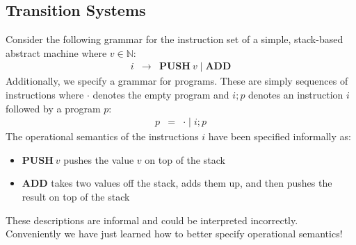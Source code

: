 \documentclass[10pt,a4paper]{exam}
\begin{document}
\begin{questions}

\section*{Transition Systems}

\question Consider the following grammar for the instruction set of a simple, stack-based abstract machine where $v \in \mathbb{N}$:
\begin{displaymath}
\begin{array}{lcl}
i & \to & \mathbf{PUSH}~v \mid \mathbf{ADD}
\end{array}
\end{displaymath}
Additionally, we specify a grammar for programs. These are simply sequences of instructions where $\cdot$ denotes the empty program and $i;p$ denotes an instruction $i$ followed by a program $p$:
\begin{displaymath}
\begin{array}{lcl}
p & = & \cdot \mid i; p
\end{array}
\end{displaymath}
The operational semantics of the instructions $i$ have been specified informally as:
\begin{itemize}
\item $\mathbf{PUSH}~v$ pushes the value $v$ on top of the stack
\item $\mathbf{ADD}$ takes two values off the stack, adds them up, and then pushes the result on top of the stack
\end{itemize}
These descriptions are informal and could be interpreted incorrectly. Conveniently we have just learned how to better specify operational semantics! 
\end{questions}
\end{document}
